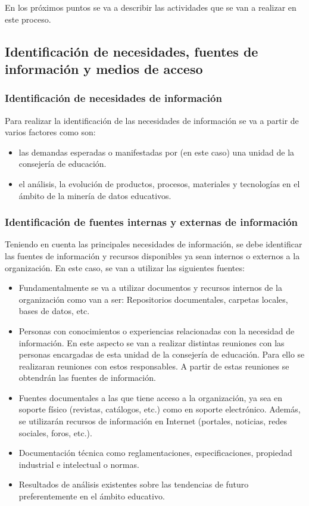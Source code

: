 En los próximos puntos se va a describir las actividades que se van a realizar en este proceso.

\subsection{Identificación de necesidades, fuentes de información y medios de acceso}
\subsubsection{Identificación de necesidades de información}
Para realizar la identificación de las necesidades de información se va a partir de varios factores como son:
\begin{itemize}
\item las demandas esperadas o manifestadas por (en este caso) una unidad de la consejería de educación.
\item el análisis, la evolución de productos, procesos, materiales y tecnologías en el ámbito de la minería de datos educativos.
\end{itemize}

\subsubsection{Identificación de fuentes internas y externas de información}
Teniendo en cuenta las principales necesidades de información, se debe identificar las fuentes de información y recursos disponibles ya sean internos o externos a la organización. En este caso, se van a utilizar las siguientes fuentes:
\begin{itemize}
\item Fundamentalmente se va a utilizar documentos y recursos internos de la organización como van a ser: Repositorios documentales, carpetas locales, bases de datos, etc.

\item Personas con conocimientos o experiencias relacionadas con la necesidad de información. En este aspecto se van a realizar distintas reuniones con las personas encargadas de esta unidad de la consejería de educación. Para ello se realizaran reuniones con estos responsables. A partir de estas reuniones se obtendrán las fuentes de información.
\item Fuentes documentales a las que tiene acceso a la organización, ya sea en soporte físico (revistas, catálogos, etc.) como en soporte electrónico. Además, se utilizarán recursos de información en Internet (portales, noticias, redes sociales, foros, etc.). 
\item Documentación técnica como reglamentaciones, especificaciones, propiedad industrial e intelectual o normas.
\item Resultados de análisis existentes sobre las tendencias de futuro preferentemente en el ámbito educativo.
\end{itemize}


